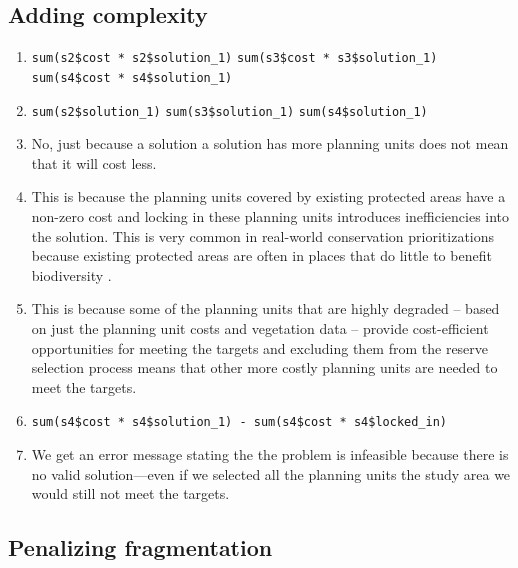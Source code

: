 \documentclass[12pt,]{book}
\providecommand{\tightlist}{%
  \setlength{\itemsep}{0pt}\setlength{\parskip}{0pt}}
\let\BeginKnitrBlock\begin \let\EndKnitrBlock\end
\begin{document}
\subsection{Adding complexity}\label{adding-complexity-1}

\BeginKnitrBlock{rmdanswer}
\begin{enumerate}
\def\labelenumi{\arabic{enumi}.}
\tightlist
\item
  \texttt{sum(s2\$cost\ *\ s2\$solution\_1)} \newline
   \texttt{sum(s3\$cost\ *\ s3\$solution\_1)} \newline
   \texttt{sum(s4\$cost\ *\ s4\$solution\_1)}
\item
  \texttt{sum(s2\$solution\_1)} \newline
   \texttt{sum(s3\$solution\_1)} \newline
   \texttt{sum(s4\$solution\_1)}
\item
  No, just because a solution a solution has more planning units does
  not mean that it will cost less.
\item
  This is because the planning units covered by existing protected areas
  have a non-zero cost and locking in these planning units introduces
  inefficiencies into the solution. This is very common in real-world
  conservation prioritizations because existing protected areas are
  often in places that do little to benefit biodiversity \citep{r3}.
\item
  This is because some of the planning units that are highly degraded --
  based on just the planning unit costs and vegetation data -- provide
  cost-efficient opportunities for meeting the targets and excluding
  them from the reserve selection process means that other more costly
  planning units are needed to meet the targets.
\item
  \texttt{sum(s4\$cost\ *\ s4\$solution\_1)\ -\ sum(s4\$cost\ *\ s4\$locked\_in)}
\item
  We get an error message stating the the problem is infeasible because
  there is no valid solution---even if we selected all the planning
  units the study area we would still not meet the targets.
\end{enumerate}
\EndKnitrBlock{rmdanswer}

\subsection{Penalizing fragmentation}\label{penalizing-fragmentation-1}
\end{document}
